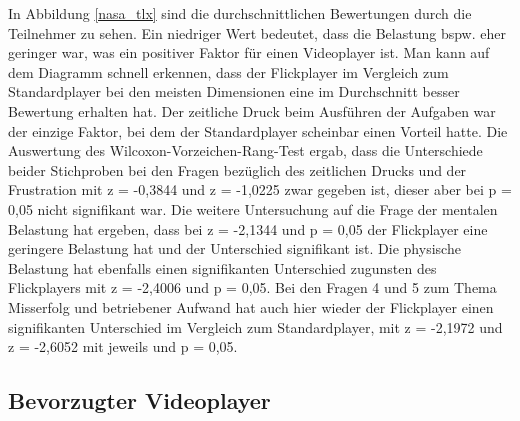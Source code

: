 \documentclass[11pt,a4paper]{report}
\begin{document}
In Abbildung \ref{nasa_tlx} sind die durchschnittlichen Bewertungen durch die Teilnehmer zu sehen. Ein niedriger Wert bedeutet, dass die Belastung bspw. eher geringer war, was ein positiver Faktor für einen Videoplayer ist. Man kann auf dem Diagramm schnell erkennen, dass der Flickplayer im Vergleich zum Standardplayer bei den meisten Dimensionen eine im Durchschnitt besser Bewertung erhalten hat. Der zeitliche Druck beim Ausführen der Aufgaben war der einzige Faktor, bei dem der Standardplayer scheinbar einen Vorteil hatte. Die Auswertung des Wilcoxon-Vorzeichen-Rang-Test ergab, dass die Unterschiede beider Stichproben bei den Fragen bezüglich des zeitlichen Drucks und der Frustration mit z = -0,3844 und z = -1,0225 zwar gegeben ist, dieser aber bei p = 0,05 nicht signifikant war. Die weitere Untersuchung auf die Frage der mentalen Belastung hat ergeben, dass bei z = -2,1344 und p = 0,05 der Flickplayer eine geringere Belastung hat und der Unterschied signifikant ist. Die physische Belastung hat ebenfalls einen signifikanten Unterschied zugunsten des Flickplayers mit z = -2,4006 und p = 0,05. Bei den Fragen 4 und 5 zum Thema Misserfolg und betriebener Aufwand hat auch hier wieder der Flickplayer einen signifikanten Unterschied im Vergleich zum Standardplayer, mit z = -2,1972 und z = -2,6052 mit jeweils und p = 0,05.

\subsection{Bevorzugter Videoplayer}
\end{document}
